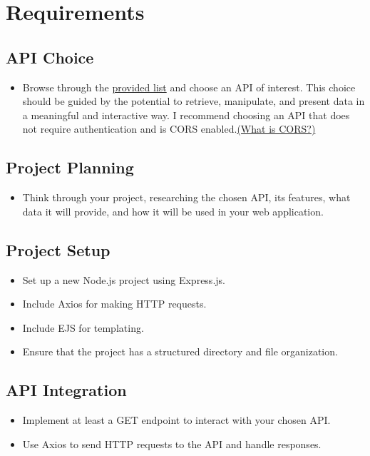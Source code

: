 \documentclass{article}
\begin{document}
\section{Requirements}

\subsection{API Choice}
\begin{itemize}
  \item Browse through the \href{https://github.com/public-api-lists/public-api-lists}{provided list}
   and choose an API of interest. This choice should be guided by the potential to retrieve, 
   manipulate, and present data in a meaningful and interactive way. I recommend choosing an 
   API that does not require authentication and is CORS enabled.\href{https://medium.com/@electra_chong/what-is-cors-what-is-it-used-for-308cafa4df1a}{(What is CORS?)}
\end{itemize}

\subsection{Project Planning}
\begin{itemize}
  \item Think through your project, researching the chosen API, its features,
   what data it will provide, and how it will be used in your web application.
\end{itemize}

\subsection{Project Setup}
\begin{itemize}
  \item Set up a new Node.js project using Express.js.
  \item Include Axios for making HTTP requests.
  \item Include EJS for templating.
  \item Ensure that the project has a structured directory and file organization.
\end{itemize}

\subsection{API Integration}
\begin{itemize}
  \item Implement at least a GET endpoint to interact with your chosen API.
  \item Use Axios to send HTTP requests to the API and handle responses.
\end{itemize}
\end{document}
